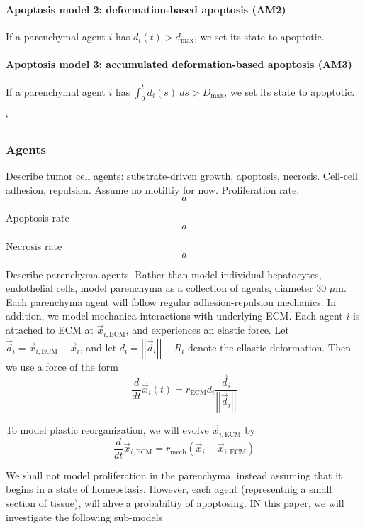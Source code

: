 \documentclass[smallextended,natbib]{svjour3}
\newcommand{\beq}{\begin{equation}}
\newcommand{\eeq}{\end{equation}}
\newcommand{\micron}{\mu\textrm{m}}
\newcommand{\norm}[1]{\left|\left|#1\right|\right|}
\begin{document}
\paragraph{Apoptosis model 2: deformation-based apoptosis (AM2)} If a parenchymal agent $i$ 
has $d_i(t) > d_\mathrm{max}$, we set its state to apoptotic. 

\paragraph{Apoptosis model 3: accumulated deformation-based apoptosis (AM3)} 
If a parenchymal agent $i$ has $\int_0^t d_i(s)\: ds > D_\mathrm{max}$, 
we set its state to apoptotic. 


\vfill
\pagebreak` 




\subsubsection{Agents}
Describe tumor cell agents: substrate-driven growth, apoptosis, necrosis. Cell-cell adhesion, repulsion. Assume no 
motiltiy for now. Proliferation rate: 
\beq
a
\eeq

Apoptosis rate
\beq
a
\eeq

Necrosis rate
\beq
a
\eeq

Describe parenchyma agents. Rather than model individual hepatocytes, endothelial cells, model parenchyma as a collection 
of agents, diameter 30 $\micron$. Each parenchyma agent will follow regular adhesion-repulsion mechanics. In addition, we model 
mechanica interactions with underlying ECM. Each agent $i$ is attached to ECM at $\vec{x}_{i,\textrm{ECM}}$, and experiences 
an elastic force. Let $\vec{d}_i = \vec{x}_{i,\textrm{ECM}} - \vec{x}_i $, and let $d_i = \norm{ \vec{d}_i } - R_i$ denote 
the ellastic deformation. Then we use a force of the form 
\beq
\frac{d}{dt} \vec{x}_{i}(t) =r_\textrm{ECM} d_i  \frac{ \vec{d}_i }{ \norm{\vec{d}_i}} 
\eeq

To model plastic reorganization, we will evolve $\vec{x}_{i,\textrm{ECM}}$ by 
\beq
\frac{d}{dt} \vec{x}_{i,\textrm{ECM}} = r_\textrm{mech} \left( \vec{x}_{i} - \vec{x}_{i,\textrm{ECM}} \right)
\eeq

We shall not model proliferation in the parenchyma, instead assuming that it begins in a state of homeostasis. 
However, each agent (representnig a small section of tissue), will ahve a probabiltiy of apoptosing. 
IN this paper, we will investigate the following sub-models 
\end{document}
